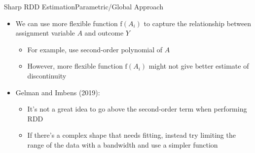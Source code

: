 \documentclass[dvipsnames,hyperref={pdfpagelabels=false}]{beamer}
\begin{document}
\begin{frame}{Sharp RDD Estimation}{Parametric/Global Approach}
	\begin{itemize}
		
		
		
		\item We can use more flexible function $\mathrm{f}(A_i)$ to capture the relationship between assignment variable $A$ and outcome $Y$
									\vspace{0.2cm}
			\begin{itemize}
			\item For example, use second-order polynomial of $A$
							\vspace{0.2cm}
		\item However, more flexible function $\mathrm{f}(A_i)$ might not give better estimate of discontinuity  
					\vspace{0.2cm}
				\end{itemize}		
		\item Gelman and Imbens (2019): 
							\vspace{0.2cm}
			\begin{itemize}
		\item It's not a great idea to go above the second-order term when performing RDD
						\vspace{0.2cm}
	
	\item If there's a complex shape that needs fitting, instead try limiting the range of the data with a bandwidth and use a simpler function
		\end{itemize}
	\end{itemize}
\end{frame}
\end{document}

